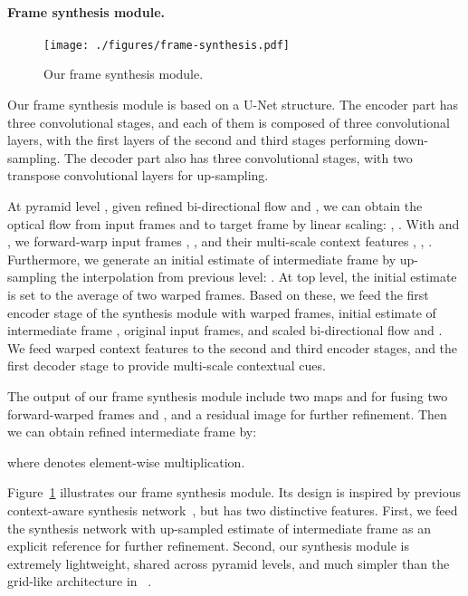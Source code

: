 \documentclass[10pt,twocolumn,letterpaper]{article}
\begin{document}
\paragraph{Frame synthesis module.}

\begin{figure}[tb]
\centering
\texttt{[image: ./figures/frame-synthesis.pdf]}
\caption{Our frame synthesis module.}
\vspace{-0.25cm}
\label{fig:synthesis-module}
\end{figure}

Our frame synthesis module is based on a U-Net structure. The encoder part has
three convolutional stages, and each of them is composed of three convolutional
layers, with the first layers of the second and third stages performing
down-sampling. The decoder part also has three convolutional stages, with two
transpose convolutional layers for up-sampling.


At pyramid level , given refined bi-directional flow 
and , we can obtain the optical flow from input frames
 and  to target frame  by linear scaling: , .  With   and , we forward-warp input frames , , and their
multi-scale context features , , .  Furthermore, we generate an
initial estimate  of intermediate frame by up-sampling the
interpolation from previous  level: . At top level, the initial estimate is set to the average of
two warped frames. Based on these, we feed the first encoder stage of the
synthesis module with warped frames, initial estimate of intermediate frame
, original input frames, and scaled bi-directional flow  and .  We feed warped context features
to the second and third encoder stages, and the first decoder stage to provide
multi-scale contextual cues.


The output of our frame synthesis module include two maps  and 
for fusing two forward-warped frames  and , and a residual image  for further refinement.
Then we can obtain refined intermediate frame  by:

where  denotes element-wise multiplication.


Figure~\ref{fig:synthesis-module} illustrates our frame synthesis module. Its
design is inspired by previous context-aware synthesis
network~\cite{niklaus2018context,niklaus2020softmax,park2021asymmetric}, but has
two distinctive features. First, we feed the synthesis network with up-sampled
estimate of intermediate frame as an explicit reference for further refinement.
Second, our synthesis module is extremely lightweight, shared across pyramid
levels, and much simpler than the grid-like architecture in
~\cite{niklaus2018context,niklaus2020softmax,park2021asymmetric}.
\end{document}
